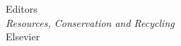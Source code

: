 \documentclass[10pt]{letter}
\begin{document}
\begin{letter}{Editors\\\textit{Resources, Conservation and Recycling}\\Elsevier}
\end{letter}
\end{document}
